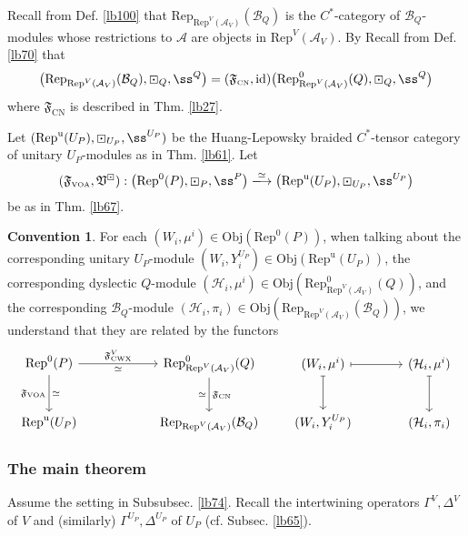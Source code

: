 \documentclass[11pt,b5paper,notitlepage]{article}
\theoremstyle{definition}
\newtheorem{cv}[df]{Convention}
\theoremstyle{plain}
\newcommand{\fk}{\mathfrak}
\newcommand{\mc}{\mathcal}
\newcommand{\id}{\mathrm{id}}
\newcommand{\Rep}{\mathrm{Rep}}
\newcommand{\Obj}{\mathrm{Obj}}
\newcommand{\CWX}{{\scriptscriptstyle \mathrm{CWX}}}
\newcommand{\VOA}{{\scriptscriptstyle \mathrm{VOA}}}
\newcommand{\CN}{{\scriptscriptstyle \mathrm{CN}}}
\newcommand{\RepUP}{\mathrm{Rep}^{\mathrm u}(U_P)}
\numberwithin{equation}{section}
\begin{document}
Recall from Def. \ref{lb100} that $\Rep_{\Rep^V(\mc A_V)}(\mc B_Q)$ is the $C^*$-category of $\mc B_Q$-modules whose restrictions to $\mc A$ are objects in $\Rep^V(\mc A_V)$. By Recall from Def. \ref{lb70} that
\begin{align}\label{eq68}
\big(\Rep_{\Rep^V(\mc A_V)}(\mc B_Q),\boxdot_Q,\ss^Q\big)=(\fk F_\CN,\id)\big(\Rep^0_{\Rep^V(\mc A_V)}(Q),\boxdot_Q,\ss^Q\big)
\end{align}
where $\fk F_\CN$ is described in Thm. \ref{lb27}.

Let $(\RepUP,\boxdot_{U_P},\ss^{U_P})$ be the Huang-Lepowsky braided $C^*$-tensor category of unitary $U_P$-modules as in Thm. \ref{lb61}. Let
\begin{align}
(\fk F_\VOA,\fk V^\boxdot):\big(\Rep^0(P),\boxdot_P,\ss^P \big)\xlongrightarrow{\simeq}\big(\RepUP,\boxdot_{U_P},\ss^{U_P}\big)
\end{align}
be as in Thm. \ref{lb67}.

\begin{cv}
For each $(W_i,\mu^i)\in\Obj(\Rep^0(P))$, when talking about the corresponding unitary $U_P$-module $(W_i,Y^{U_P}_i)\in\Obj(\RepUP)$, the corresponding dyslectic $Q$-module $(\mc H_i,\mu^i)\in\Obj(\Rep^0_{\Rep^V(\mc A_V)}(Q))$, and the corresponding $\mc B_Q$-module $(\mc H_i,\pi_i)\in\Obj(\Rep_{\Rep^V(\mc A_V)}(\mc B_Q))$, we understand that they are related by the functors
\begin{equation}\label{eq69}
\begin{tikzcd}[row sep=large,column sep=2cm]
\Rep^0(P) \arrow[r,"{\fk F^V_\CWX}","\simeq"'] \arrow[d,"{\fk F_\VOA}"',"\simeq"] & \Rep^0_{\Rep^V(\mc A_V)}(Q) \arrow[d,"{\fk F_\CN}","\simeq"'] \\
\RepUP          & \Rep_{\Rep^V(\mc A_V)}(\mc B_Q)          
\end{tikzcd}
\qquad
\begin{tikzcd}[sep=large]
(W_i,\mu^i) \arrow[r,mapsto]\arrow[d,mapsto] & (\mc H_i,\mu^i)\arrow[d,mapsto]\\
(W_i,Y^{U_P}_i)& (\mc H_i,\pi_i)
\end{tikzcd}
\end{equation}
\end{cv}


\subsubsection{The main theorem}

Assume the setting in Subsubsec. \ref{lb74}. Recall the intertwining operators $\Gamma^V,\Delta^V$ of $V$ and (similarly) $\Gamma^{U_P},\Delta^{U_P}$ of $U_P$ (cf. Subsec. \ref{lb65}).
\end{document}
